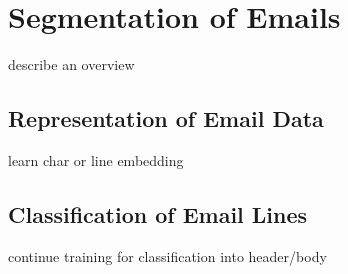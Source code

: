 \documentclass{llncs}
\begin{document}











\section{Segmentation of Emails}
describe an overview

\subsection{Representation of Email Data}
learn char or line embedding

\subsection{Classification of Email Lines}
continue training for classification into header/body
\end{document}

